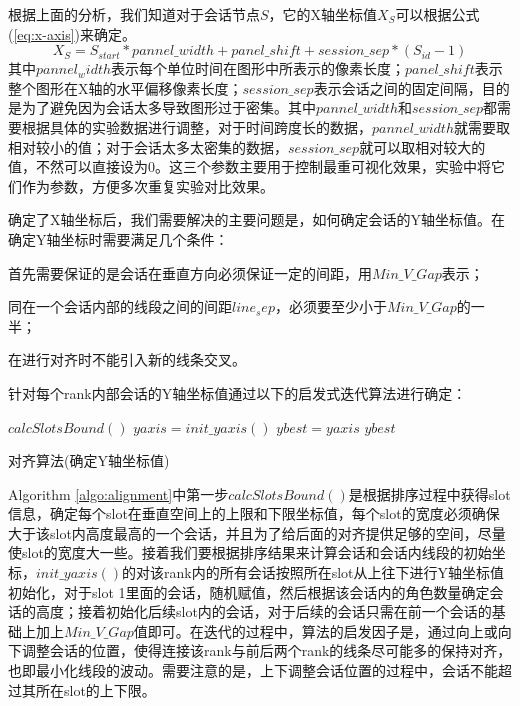 根据上面的分析，我们知道对于会话节点$S$，它的X轴坐标值$X_S$可以根据公式(\ref{eq:x-axis})来确定。
\begin{equation}
\label{eq:x-axis}
X_S = S_{start} * pannel\_width + panel\_shift + session\_sep * (S_{id} -1)
\end{equation}
其中$pannel_width$表示每个单位时间在图形中所表示的像素长度；$panel\_shift$表示整个图形在X轴的水平偏移像素长度；$session\_sep$表示会话之间的固定间隔，目的是为了避免因为会话太多导致图形过于密集。其中$pannel\_width$和$session\_sep$都需要根据具体的实验数据进行调整，对于时间跨度长的数据，$pannel\_width$就需要取相对较小的值；对于会话太多太密集的数据，$session\_sep$就可以取相对较大的值，不然可以直接设为0。这三个参数主要用于控制最重可视化效果，实验中将它们作为参数，方便多次重复实验对比效果。

确定了X轴坐标后，我们需要解决的主要问题是，如何确定会话的Y轴坐标值。在确定Y轴坐标时需要满足几个条件：
\begin{inparaenum}[\itshape 1 \upshape)]
\item 首先需要保证的是会话在垂直方向必须保证一定的间距，用$Min\_V\_Gap$表示；
\item 同在一个会话内部的线段之间的间距$line_sep$，必须要至少小于$Min\_V\_Gap$的一半；
\item 在进行对齐时不能引入新的线条交叉。
\end{inparaenum}
针对每个rank内部会话的Y轴坐标值通过以下的启发式迭代算法进行确定：
\begin{algorithm}[!htb]
  $calcSlotsBound()$\;
  $yaxis = init\_yaxis()$\;
  $ybest = yaxis$\;
  \Return $ybest$\;
  \caption{对齐算法(确定Y轴坐标值)}
  \label{algo:alignment}
\end{algorithm}

Algorithm \ref{algo:alignment}中第一步$calcSlotsBound()$是根据排序过程中获得slot信息，确定每个slot在垂直空间上的上限和下限坐标值，每个slot的宽度必须确保大于该slot内高度最高的一个会话，并且为了给后面的对齐提供足够的空间，尽量使slot的宽度大一些。接着我们要根据排序结果来计算会话和会话内线段的初始坐标，$init\_yaxis()$的对该rank内的所有会话按照所在slot从上往下进行Y轴坐标值初始化，对于slot 1里面的会话，随机赋值，然后根据该会话内的角色数量确定会话的高度；接着初始化后续slot内的会话，对于后续的会话只需在前一个会话的基础上加上$Min\_V\_Gap$值即可。在迭代的过程中，算法的启发因子是，通过向上或向下调整会话的位置，使得连接该rank与前后两个rank的线条尽可能多的保持对齐，也即最小化线段的波动。需要注意的是，上下调整会话位置的过程中，会话不能超过其所在slot的上下限。

